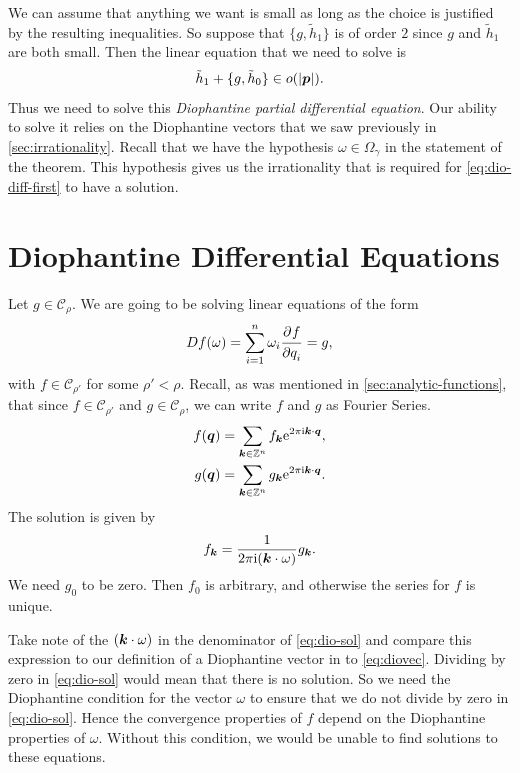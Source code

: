 \documentclass[twoside,letterpaper,11pt]{article}
\numberwithin{equation}{section}
\begin{document}
We can assume that anything we want is small as long as the choice is justified
by the resulting inequalities.
So suppose that $\{g, \tilde{h}_1\}$ is of order $2$ since $g$ and $\tilde{h}_1$
are both small.
Then the linear equation that we need to solve is
\begin{equation}
  \label{eq:dio-diff-first}
  \tilde{h}_1 + \{g, \tilde{h}_0\} \in o(|\bm{p}|).
\end{equation}
Thus we need to solve this \emph{Diophantine partial differential equation}.
Our ability to solve it relies on the Diophantine vectors that we saw previously
in \cref{sec:irrationality}.
Recall that we have the hypothesis $\omega \in \Omega_{\gamma}$ in the statement
of the theorem.
This hypothesis gives us the irrationality that is required for
\cref{eq:dio-diff-first} to have a solution.

\section{Diophantine Differential Equations}
\label{sec:dioph-diff-equat}

Let $g \in \mathcal{C}_{\rho}$.
We are going to be solving linear equations of the form
\begin{equation}
  \label{eq:dio-form}
  \mathop{}\!D f(\omega) = \sum_{i = 1}^n \omega_i \frac{\strut\partial^{}f}{\strut\partial q_i^{}} = g,
\end{equation}
with $f \in \mathcal{C}_{\rho'}$ for some $\rho' < \rho$.
Recall, as was mentioned in \cref{sec:analytic-functions}, that since $f \in
\mathcal{C}_{\rho'}$ and $g \in \mathcal{C}_{\rho}$, we can write $f$ and $g$ as
Fourier Series.
\begin{align*}
  f(\bm{q}) &= \sum_{\bm{k} \in \mathbb{Z}^n} f_{\bm{k}} \mathrm{e}^{2 \pi \mathrm{i} \bm{k} \cdot
    \bm{q}},\\
  g(\bm{q}) &= \sum_{\bm{k} \in \mathbb{Z}^n} g_{\bm{k}} \mathrm{e}^{2 \pi \mathrm{i} \bm{k} \cdot \bm{q}}.
\end{align*}
The solution is given by
\begin{equation}
  \label{eq:dio-sol}
  f_{\bm{k}} = \frac{1}{2 \pi \mathrm{i} (\bm{k} \cdot \omega)}g_{\bm{k}}.
\end{equation}
We need $g_0$ to be zero.
Then $f_0$ is arbitrary, and otherwise the series for $f$ is unique.

Take note of the $(\bm{k} \cdot \omega)$ in the denominator of \cref{eq:dio-sol}
and compare this expression to our definition of a Diophantine vector in to
\cref{eq:diovec}.
Dividing by zero in \cref{eq:dio-sol} would mean that there is no solution.
So we need the Diophantine condition for the vector $\omega$ to ensure that we
do not divide by zero in \cref{eq:dio-sol}.
Hence the convergence properties of $f$ depend on the Diophantine properties of
$\omega$.
Without this condition, we would be unable to find solutions to these equations.
\end{document}
